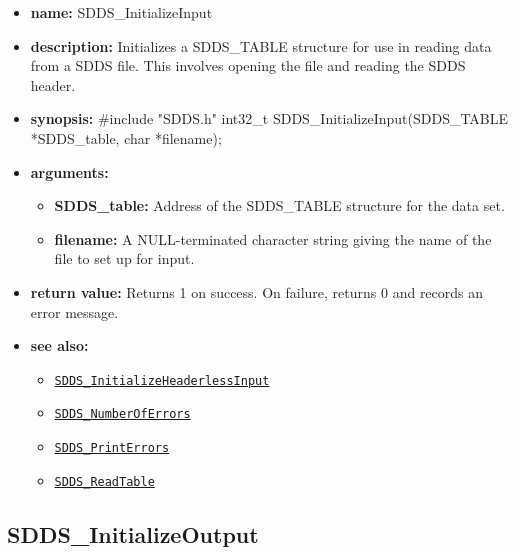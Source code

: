 \documentclass[11pt]{article}
\newcommand{\progref}[1]{\hyperref[SDDS_#1]{\tt SDDS\_#1}}
\begin{document}
\begin{itemize}
\item {\bf name:}\newline
SDDS\_InitializeInput
\item {\bf description:}\newline
Initializes a SDDS\_TABLE structure for use in reading data from a SDDS file. This involves opening the file and reading the SDDS header.
\item {\bf synopsis:} \#include "SDDS.h"\newline
int32\_t SDDS\_InitializeInput(SDDS\_TABLE *SDDS\_table, char *filename);
\item {\bf arguments:}
\begin{itemize}
\item {\bf SDDS\_table:} Address of the SDDS\_TABLE structure for the data set.
\item {\bf filename:} A NULL-terminated character string giving the name of the file to set up for input.
\end{itemize}
\item {\bf return value:}\newline
Returns 1 on success. On failure, returns 0 and records an error message.
\item {\bf see also:}
\begin{itemize}
\item \progref{InitializeHeaderlessInput}
\item \progref{NumberOfErrors}
\item \progref{PrintErrors}
\item \progref{ReadTable}
\end{itemize}
\end{itemize}

\subsection{SDDS\_InitializeOutput}
\label{SDDS_InitializeOutput}
\end{document}
